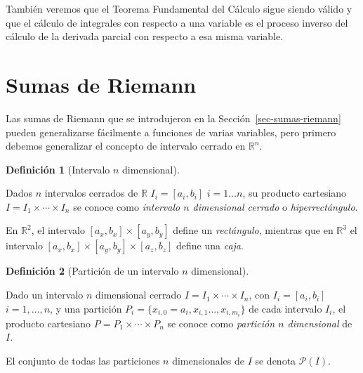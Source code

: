 \documentclass[
  a4paper,
]{scrreport}
\theoremstyle{definition}
\theoremstyle{definition}
\theoremstyle{definition}
\newtheorem{definition}{Definición}[chapter]
\theoremstyle{plain}
\theoremstyle{plain}
\theoremstyle{plain}
\theoremstyle{remark}
\begin{document}
También veremos que el Teorema Fundamental del Cálculo sigue siendo
válido y que el cálculo de integrales con respecto a una variable es el
proceso inverso del cálculo de la derivada parcial con respecto a esa
misma variable.

\section{Sumas de Riemann}\label{sumas-de-riemann}

Las sumas de Riemann que se introdujeron en la
Sección~\ref{sec-sumas-riemann} pueden generalizarse fácilmente a
funciones de varias variables, pero primero debemos generalizar el
concepto de intervalo cerrado en \(\mathbb{R}^n\).

\begin{definition}[Intervalo \(n\)
dimensional]\protect\hypertarget{def-intervalo-n-dimensional-cerrado}{}\label{def-intervalo-n-dimensional-cerrado}

Dados \(n\) intervalos cerrados de \(\mathbb{R}\) \(I_i=[a_i,b_i]\)
\(i=1\ldots n\), su producto cartesiano
\(I = I_1\times \cdots \times I_n\) se conoce como \emph{intervalo \(n\)
dimensional cerrado} o \emph{hiperrectángulo}.

\end{definition}

\begin{tcolorbox}[enhanced jigsaw, bottomtitle=1mm, title=\textcolor{quarto-callout-note-color}{\faInfo}\hspace{0.5em}{Nota}, colbacktitle=quarto-callout-note-color!10!white, coltitle=black, leftrule=.75mm, colback=white, toptitle=1mm, toprule=.15mm, titlerule=0mm, opacitybacktitle=0.6, colframe=quarto-callout-note-color-frame, bottomrule=.15mm, arc=.35mm, rightrule=.15mm, breakable, left=2mm, opacityback=0]

En \(\mathbb{R}^2\), el intervalo \([a_x,b_x]\times [a_y,b_y]\) define
un \emph{rectángulo}, mientras que en \(\mathbb{R}^3\) el intervalo
\([a_x,b_x]\times [a_y,b_y]\times [a_z,b_z]\) define una \emph{caja}.

\end{tcolorbox}

\begin{definition}[Partición de un intervalo \(n\)
dimensional]\protect\hypertarget{def-particion-n-dimensional}{}\label{def-particion-n-dimensional}

Dado un intervalo \(n\) dimensional cerrado
\(I=I_1\times\cdots\times I_n\), con \(I_i=[a_i,b_i]\) \(i=1,\ldots,n\),
y una partición \(P_i=\{x_{i,0}=a_i,x_{i,1}\ldots,x_{i,m_i}\}\) de cada
intervalo \(I_i\), el producto cartesiano
\(P=P_1\times\cdots\times P_n\) se conoce como \emph{partición \(n\)
dimensional} de \(I\).

El conjunto de todas las particiones \(n\) dimensionales de \(I\) se
denota \(\mathcal{P}(I)\).

\end{definition}
\end{document}
